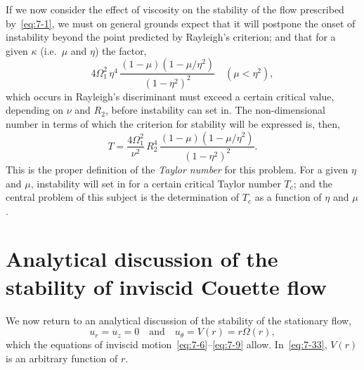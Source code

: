If we now consider the effect of viscosity on the stability of the flow
prescribed by~\eqref{eq:7-1}, we must on general grounds expect that it will postpone the onset of instability beyond the point predicted by Rayleigh's
criterion; and that for a given $\kappa$ (i.e.\ $\mu$ and $\eta$) the factor,
\begin{equation}
\label{eq:7-31}
4\Omega_1^2\,\eta^4\,\frac{(1-\mu)(1-\mu/\eta^2)}{(1-\eta^2)^2}
\quad (\mu < \eta^2),
\end{equation}
which occurs in Rayleigh's discriminant must exceed a certain critical
value, depending on $\nu$ and $R_2$, before instability can set in.  The non-dimensional number in terms of which the criterion for stability will be
expressed is, then,
\begin{equation}
\label{eq:7-32}
T = \frac{4\Omega_1^2}{\nu^2}\,R_2^4\,\frac{(1-\mu)(1-\mu/\eta^2)}{(1-\eta^2)^2}.
\end{equation}
This is the proper definition of the \emph{Taylor number} for this problem.  For
a given $\eta$ and $\mu$, instability will set in for a certain critical Taylor number
$T_c$; and the central problem of this subject is the determination of $T_c$ as a
function of $\eta$ and $\mu$.

\section{Analytical discussion of the stability of inviscid Couette flow}
\label{sec:7-67}
We now return to an analytical discussion of the stability of the
stationary flow,
\begin{equation}
\label{eq:7-33}
u_r = u_z = 0 \quad \text{and} \quad u_\theta = V(r) = r\Omega(r),
\end{equation}
which the equations of inviscid motion~\eqref{eq:7-6}--\eqref{eq:7-9} allow.
In~\eqref{eq:7-33}, $V(r)$ is an arbitrary function of $r$.

